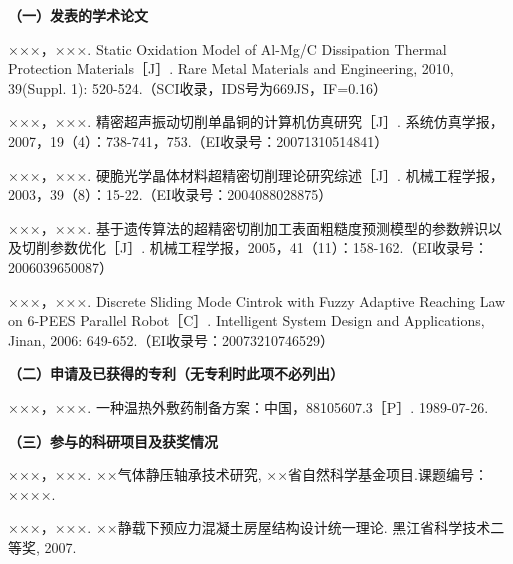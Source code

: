 \begin{publication}
\noindent\textbf{（一）发表的学术论文}
\begin{publist}
\item ×××，×××. Static Oxidation Model of Al-Mg/C Dissipation Thermal Protection Materials［J］. Rare Metal Materials and Engineering, 2010, 39(Suppl. 1): 520-524.（SCI收录，IDS号为669JS，IF=0.16）
\item ×××，×××. 精密超声振动切削单晶铜的计算机仿真研究［J］. 系统仿真学报，2007，19（4）：738-741，753.（EI收录号：20071310514841）
\item ×××，×××. 硬脆光学晶体材料超精密切削理论研究综述［J］. 机械工程学报，2003，39（8）：15-22.（EI收录号：2004088028875）
\item ×××，×××. 基于遗传算法的超精密切削加工表面粗糙度预测模型的参数辨识以及切削参数优化［J］. 机械工程学报，2005，41（11）：158-162.（EI收录号：2006039650087）
\item ×××，×××. Discrete Sliding Mode Cintrok with Fuzzy Adaptive Reaching Law on 6-PEES Parallel Robot［C］. Intelligent System Design and Applications, Jinan, 2006: 649-652.（EI收录号：20073210746529）
\end{publist}

\noindent\textbf{（二）申请及已获得的专利（无专利时此项不必列出）}
\begin{publist}
\item ×××，×××. 一种温热外敷药制备方案：中国，88105607.3［P］. 1989-07-26.
\end{publist}

\noindent\textbf{（三）参与的科研项目及获奖情况}
\begin{publist}
\item ×××，×××. ××气体静压轴承技术研究, ××省自然科学基金项目.课题编号：××××.
\item ×××，×××. ××静载下预应力混凝土房屋结构设计统一理论. 黑江省科学技术二等奖, 2007.
\end{publist}
\end{publication}

